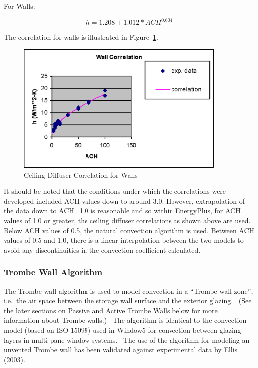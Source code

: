 For Walls:

\begin{equation}
h = 1.208 + 1.012 * AC{H^{0.604}}
\end{equation}

The correlation for walls is illustrated in Figure~\ref{fig:ceiling-diffuser-correlation-for-walls}.

\begin{figure}[hbtp] %
\centering
\includegraphics[width=0.9\textwidth, height=0.9\textheight, keepaspectratio=true]{media/image382.png}
\caption{Ceiling Diffuser Correlation for Walls \protect \label{fig:ceiling-diffuser-correlation-for-walls}}
\end{figure}

It should be noted that the conditions under which the correlations were developed included ACH values down to around 3.0.  However, extrapolation of the data down to ACH=1.0 is reasonable and so within EnergyPlus, for ACH values of 1.0 or greater, the ceiling diffuser correlations as shown above are used.  Below ACH values of 0.5, the natural convection algorithm is used.  Between ACH values of 0.5 and 1.0, there is a linear interpolation between the two models to avoid any discontinuities in the convection coefficient calculated.

\subsubsection{Trombe Wall Algorithm}\label{trombe-wall-algorithm}

The Trombe wall algorithm is used to model convection in a ``Trombe wall zone'', i.e.~the air space between the storage wall surface and the exterior glazing.~ (See the later sections on Passive and Active Trombe Walls below for more information about Trombe walls.)~ The algorithm is identical to the convection model (based on ISO 15099) used in Window5 for convection between glazing layers in multi-pane window systems.~ The use of the algorithm for modeling an unvented Trombe wall has been validated against experimental data by Ellis (2003).

